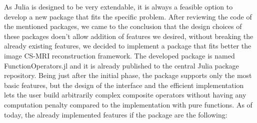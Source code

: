 As Julia is designed to be very extendable, it is always a feasible option to develop a new package that fits the specific problem. After reviewing the code of the mentioned packages, we came to the conclusion that the design choices of these packages doen't allow addition of features we desired, without breaking the already existing features, we decided to implement a package that fits better the image CS-MRI reconstruction framework. The developed package is named FunctionOperators.jl and it is already published to the central Julia package repository. Being just after the initial phase, the package supports only the most basic features, but the design of the interface and the efficient implementation lets the user build arbitrarily complex composite operators without having any computation penalty compared to the implementation with pure functions. As of today, the already implemented features if the package are the following:
